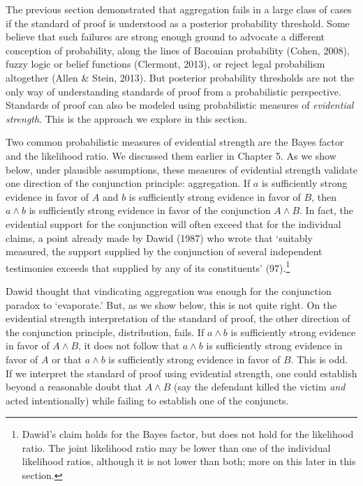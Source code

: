 \documentclass[
  10pt,
  dvipsnames,enabledeprecatedfontcommands]{scrartcl}
\begin{document}
\label{sec:strength}

The previous section demonstrated that aggregation fails in a large
class of cases if the standard of proof is understood as a posterior
probability threshold. Some believe that such failures are strong enough
ground to advocate a different conception of probability, along the
lines of Baconian probability (Cohen, 2008), fuzzy logic or belief
functions (Clermont, 2013), or reject legal probabilism altogether
(Allen \& Stein, 2013). But posterior probability thresholds are not the
only way of understanding standards of proof from a probabilistic
perspective. Standards of proof can also be modeled using probabilistic
measures of \textit{evidential strength}. This is the approach we
explore in this section.

Two common probabilistic measures of evidential strength are the Bayes
factor and the likelihood ratio. We discussed them earlier in Chapter 5.
As we show below, under plausible assumptions, these measures of
evidential strength validate one direction of the conjunction principle:
aggregation. If \(a\) is sufficiently strong evidence in favor of \(A\)
and \(b\) is sufficiently strong evidence in favor of \(B\), then
\(a\wedge b\) is sufficiently strong evidence in favor of the
conjunction \(A \wedge B\). In fact, the evidential support for the
conjunction will often exceed that for the individual claims, a point
already made by Dawid (1987) who wrote that `suitably measured, the
support supplied by the conjunction of several independent testimonies
exceeds that supplied by any of its constituents' (97).\footnote{Dawid's
  claim holds for the Bayes factor, but does not hold for the likelihood
  ratio. The joint likelihood ratio may be lower than one of the
  individual likelihood ratios, although it is not lower than both; more
  on this later in this section.}

Dawid thought that vindicating aggregation was enough for the
conjunction paradox to `evaporate.' But, as we show below, this is not
quite right. On the evidential strength interpretation of the standard
of proof, the other direction of the conjunction principle,
distribution, fails. If \(a \wedge b\) is sufficiently strong evidence
in favor of \(A \wedge B\), it does not follow that \(a\wedge b\) is
sufficiently strong evidence in favor of \(A\) or that \(a\wedge b\) is
sufficiently strong evidence in favor of \(B\). This is odd. If we
interpret the standard of proof using evidential strength, one could
establish beyond a reasonable doubt that \(A \wedge B\) (say the
defendant killed the victim \textit{and} acted intentionally) while
failing to establish one of the conjuncts.
\end{document}
